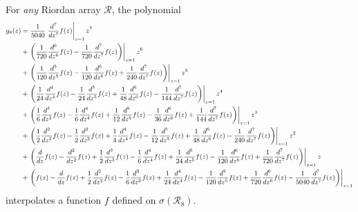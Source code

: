 \begin{remark}
For \textit{any} Riordan array $\mathcal{R}$, the polynomial
\begin{displaymath}
\small
\begin{split}
g_{8}{\left (z \right )}
    &= \frac{1}{5040} \left.\frac{d^{7}}{d z^{7}}  f{\left (z \right )}\right|_{z=1} z^{7}\\
    &+ \left. \left(\frac{1}{720} \frac{d^{6}}{d z^{6}}  f{\left (z \right )} - \frac{1}{720} \frac{d^{7}}{d z^{7}}  f{\left (z \right )}\right)\right|_{z=1} z^{6} \\
    &+ \left. \left(\frac{1}{120} \frac{d^{5}}{d z^{5}}  f{\left (z \right )} - \frac{1}{120} \frac{d^{6}}{d z^{6}}  f{\left (z \right )} + \frac{1}{240} \frac{d^{7}}{d z^{7}}  f{\left (z \right )}\right)\right|_{z=1} z^{5}\\
    &+ \left. \left(\frac{1}{24} \frac{d^{4}}{d z^{4}}  f{\left (z \right )} - \frac{1}{24} \frac{d^{5}}{d z^{5}}  f{\left (z \right )} + \frac{1}{48} \frac{d^{6}}{d z^{6}}  f{\left (z \right )} - \frac{1}{144} \frac{d^{7}}{d z^{7}}  f{\left (z \right )}\right)\right|_{z=1} z^{4}\\
    &+ \left. \left(\frac{1}{6} \frac{d^{3}}{d z^{3}}  f{\left (z \right )} - \frac{1}{6} \frac{d^{4}}{d z^{4}}  f{\left (z \right )} + \frac{1}{12} \frac{d^{5}}{d z^{5}}  f{\left (z \right )} - \frac{1}{36} \frac{d^{6}}{d z^{6}}  f{\left (z \right )} + \frac{1}{144} \frac{d^{7}}{d z^{7}}  f{\left (z \right )}\right)\right|_{z=1} z^{3}\\
    &+ \left. \left(\frac{1}{2} \frac{d^{2}}{d z^{2}}  f{\left (z \right )} - \frac{1}{2} \frac{d^{3}}{d z^{3}}  f{\left (z \right )} + \frac{1}{4} \frac{d^{4}}{d z^{4}}  f{\left (z \right )} - \frac{1}{12} \frac{d^{5}}{d z^{5}}  f{\left (z \right )} + \frac{1}{48} \frac{d^{6}}{d z^{6}}  f{\left (z \right )} - \frac{1}{240} \frac{d^{7}}{d z^{7}}  f{\left (z \right )}\right)\right|_{z=1} z^{2}\\
    &+ \left. \left(\frac{d}{d z} f{\left (z \right )} - \frac{d^{2}}{d z^{2}}  f{\left (z \right )} + \frac{1}{2} \frac{d^{3}}{d z^{3}}  f{\left (z \right )} - \frac{1}{6} \frac{d^{4}}{d z^{4}}  f{\left (z \right )} + \frac{1}{24} \frac{d^{5}}{d z^{5}}  f{\left (z \right )} - \frac{1}{120} \frac{d^{6}}{d z^{6}}  f{\left (z \right )} + \frac{1}{720} \frac{d^{7}}{d z^{7}}  f{\left (z \right )}\right)\right|_{z=1} z\\
    &+ \left. \left(f{\left (z \right )} - \frac{d}{d z} f{\left (z \right )} + \frac{1}{2} \frac{d^{2}}{d z^{2}}  f{\left (z \right )} - \frac{1}{6} \frac{d^{3}}{d z^{3}}  f{\left (z \right )} + \frac{1}{24} \frac{d^{4}}{d z^{4}}  f{\left (z \right )} - \frac{1}{120} \frac{d^{5}}{d z^{5}}  f{\left (z \right )} + \frac{1}{720} \frac{d^{6}}{d z^{6}}  f{\left (z \right )} - \frac{1}{5040} \frac{d^{7}}{d z^{7}}  f{\left (z \right )}\right)\right|_{z=1}
\end{split}
\end{displaymath}
interpolates a function $f$ defined on $\sigma(\mathcal{R}_{8})$.
\end{remark}



